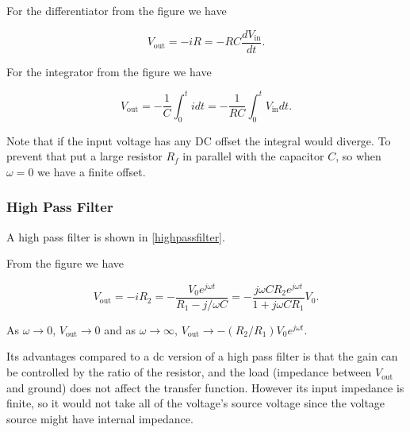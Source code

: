 \documentclass[english,a4paper,12pt]{report}
\begin{document}
For the differentiator from the figure we have

\begin{equation}
    V_{\text{out} } = -iR = -RC \frac{dV_{\text{in} } }{dt}. 
\end{equation}

For the integrator from the figure we have

\begin{equation}
    V_{\text{out} } = -\frac{1}{C} \int_{0}^{t} idt = -\frac{1}{RC} \int_{0}^{t} V_{\text{in} }dt.    
\end{equation}


Note that if the input voltage has any DC offset the integral would diverge. To prevent that put a large resistor \(R_{f} \) in parallel with the capacitor \(C\), so when \(\omega = 0\) we have a finite offset. 



\subsubsection{High Pass Filter}

A high pass filter is shown in \cref{highpassfilter}.

From the figure we have 

\begin{equation}
    V_{\text{out} } = -iR_2 = -\frac{V_0 e^{j \omega t} }{R_1 -j /\omega C} = -\frac{j \omega C R_2 e^{j \omega t} }{1+j \omega CR_1 } V_0.  
\end{equation}

As \(\omega \to 0\), \(V_{\text{out} } \to 0\) and as \(\omega \to \infty\), \(V_{\text{out} } \to -(R_2 /R_1 )V_0 e^{j \omega t} \).    

Its advantages compared to a dc version of a high pass filter is that the gain can be controlled by the ratio of the resistor, and the load (impedance between \(V_{\text{out} } \) and ground) does not affect the transfer function. However its input impedance is finite, so it would not take all of the voltage's source voltage since the voltage source might have internal impedance.

\end{document}
